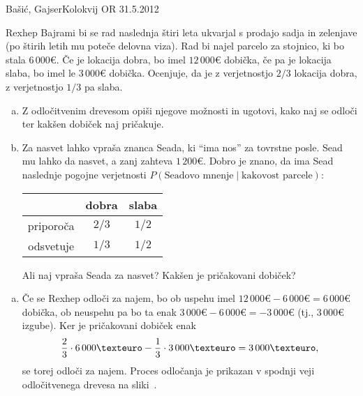 \begin{naloga}{Bašić, Gajser}{Kolokvij OR 31.5.2012}
\begin{vprasanje}
Rexhep Bajrami bi se rad naslednja štiri leta
ukvarjal s prodajo sadja in zelenjave
(po štirih letih mu poteče delovna viza).
Rad bi najel parcelo za stojnico, ki bo stala $6\,000 €$.
Če je lokacija dobra, bo imel $12\,000 €$ dobička,
če pa je lokacija slaba, bo imel le $3\,000 €$ dobička.
Ocenjuje, da je z verjetnostjo $2/3$ lokacija dobra,
z verjetnostjo $1/3$ pa slaba.
\begin{enumerate}[(a)]
\item Z odločitvenim drevesom opiši njegove možnosti in ugotovi,
kako naj se odloči ter kakšen dobiček naj pričakuje.
\item Za nasvet lahko vpraša znanca Seada, ki ``ima nos'' za tovrstne posle.
Sead mu lahko da nasvet, a zanj zahteva $1\,200 €$.
Dobro je znano, da ima Sead naslednje pogojne verjetnosti
$P(\text{Seadovo mnenje} \; | \; \text{kakovost parcele})$:
\begin{center}
\begin{tabular}{c|cc}
& dobra & slaba \\
\hline
priporoča & $2/3$ & $1/2$ \\
odsvetuje & $1/3$ & $1/2$
\end{tabular}
\end{center}
Ali naj vpraša Seada za nasvet?
Kakšen je pričakovani dobiček?
\end{enumerate}
\end{vprasanje}

\begin{odgovor}
\begin{enumerate}[(a)]
\item Če se Rexhep odloči za najem,
bo ob uspehu imel $12\,000 € - 6\,000 € = 6\,000 €$ dobička,
ob neuspehu pa bo ta enak $3\,000 € - 6\,000 € = -3\,000 €$
(tj., $3\,000 €$ izgube).
Ker je pričakovani dobiček enak
$$
{2 \over 3} \cdot 6\,000 € - {1 \over 3} \cdot 3\,000 € = 3\,000 € ,
$$
se torej odloči za najem.
Proces odločanja je prikazan
v spodnji veji od\-lo\-čit\-ve\-ne\-ga drevesa na sliki~\fig.


\end{enumerate}
\end{odgovor}
\end{naloga}
